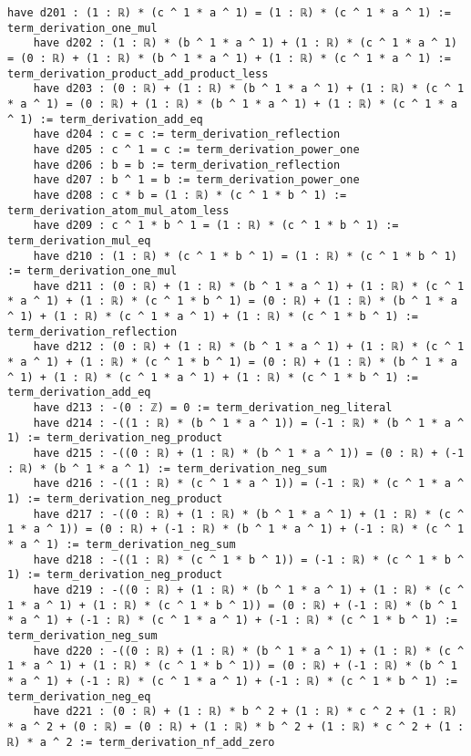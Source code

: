 \documentclass{article}
\begin{document}
\begin{tcolorbox}[colback=white!10, width=\linewidth]
\begin{lstlisting}[language=Lean4]
    have d201 : (1 : ℝ) * (c ^ 1 * a ^ 1) = (1 : ℝ) * (c ^ 1 * a ^ 1) := term_derivation_one_mul
    have d202 : (1 : ℝ) * (b ^ 1 * a ^ 1) + (1 : ℝ) * (c ^ 1 * a ^ 1) = (0 : ℝ) + (1 : ℝ) * (b ^ 1 * a ^ 1) + (1 : ℝ) * (c ^ 1 * a ^ 1) := term_derivation_product_add_product_less
    have d203 : (0 : ℝ) + (1 : ℝ) * (b ^ 1 * a ^ 1) + (1 : ℝ) * (c ^ 1 * a ^ 1) = (0 : ℝ) + (1 : ℝ) * (b ^ 1 * a ^ 1) + (1 : ℝ) * (c ^ 1 * a ^ 1) := term_derivation_add_eq
    have d204 : c = c := term_derivation_reflection
    have d205 : c ^ 1 = c := term_derivation_power_one
    have d206 : b = b := term_derivation_reflection
    have d207 : b ^ 1 = b := term_derivation_power_one
    have d208 : c * b = (1 : ℝ) * (c ^ 1 * b ^ 1) := term_derivation_atom_mul_atom_less
    have d209 : c ^ 1 * b ^ 1 = (1 : ℝ) * (c ^ 1 * b ^ 1) := term_derivation_mul_eq
    have d210 : (1 : ℝ) * (c ^ 1 * b ^ 1) = (1 : ℝ) * (c ^ 1 * b ^ 1) := term_derivation_one_mul
    have d211 : (0 : ℝ) + (1 : ℝ) * (b ^ 1 * a ^ 1) + (1 : ℝ) * (c ^ 1 * a ^ 1) + (1 : ℝ) * (c ^ 1 * b ^ 1) = (0 : ℝ) + (1 : ℝ) * (b ^ 1 * a ^ 1) + (1 : ℝ) * (c ^ 1 * a ^ 1) + (1 : ℝ) * (c ^ 1 * b ^ 1) := term_derivation_reflection
    have d212 : (0 : ℝ) + (1 : ℝ) * (b ^ 1 * a ^ 1) + (1 : ℝ) * (c ^ 1 * a ^ 1) + (1 : ℝ) * (c ^ 1 * b ^ 1) = (0 : ℝ) + (1 : ℝ) * (b ^ 1 * a ^ 1) + (1 : ℝ) * (c ^ 1 * a ^ 1) + (1 : ℝ) * (c ^ 1 * b ^ 1) := term_derivation_add_eq
    have d213 : -(0 : ℤ) = 0 := term_derivation_neg_literal
    have d214 : -((1 : ℝ) * (b ^ 1 * a ^ 1)) = (-1 : ℝ) * (b ^ 1 * a ^ 1) := term_derivation_neg_product
    have d215 : -((0 : ℝ) + (1 : ℝ) * (b ^ 1 * a ^ 1)) = (0 : ℝ) + (-1 : ℝ) * (b ^ 1 * a ^ 1) := term_derivation_neg_sum
    have d216 : -((1 : ℝ) * (c ^ 1 * a ^ 1)) = (-1 : ℝ) * (c ^ 1 * a ^ 1) := term_derivation_neg_product
    have d217 : -((0 : ℝ) + (1 : ℝ) * (b ^ 1 * a ^ 1) + (1 : ℝ) * (c ^ 1 * a ^ 1)) = (0 : ℝ) + (-1 : ℝ) * (b ^ 1 * a ^ 1) + (-1 : ℝ) * (c ^ 1 * a ^ 1) := term_derivation_neg_sum
    have d218 : -((1 : ℝ) * (c ^ 1 * b ^ 1)) = (-1 : ℝ) * (c ^ 1 * b ^ 1) := term_derivation_neg_product
    have d219 : -((0 : ℝ) + (1 : ℝ) * (b ^ 1 * a ^ 1) + (1 : ℝ) * (c ^ 1 * a ^ 1) + (1 : ℝ) * (c ^ 1 * b ^ 1)) = (0 : ℝ) + (-1 : ℝ) * (b ^ 1 * a ^ 1) + (-1 : ℝ) * (c ^ 1 * a ^ 1) + (-1 : ℝ) * (c ^ 1 * b ^ 1) := term_derivation_neg_sum
    have d220 : -((0 : ℝ) + (1 : ℝ) * (b ^ 1 * a ^ 1) + (1 : ℝ) * (c ^ 1 * a ^ 1) + (1 : ℝ) * (c ^ 1 * b ^ 1)) = (0 : ℝ) + (-1 : ℝ) * (b ^ 1 * a ^ 1) + (-1 : ℝ) * (c ^ 1 * a ^ 1) + (-1 : ℝ) * (c ^ 1 * b ^ 1) := term_derivation_neg_eq
    have d221 : (0 : ℝ) + (1 : ℝ) * b ^ 2 + (1 : ℝ) * c ^ 2 + (1 : ℝ) * a ^ 2 + (0 : ℝ) = (0 : ℝ) + (1 : ℝ) * b ^ 2 + (1 : ℝ) * c ^ 2 + (1 : ℝ) * a ^ 2 := term_derivation_nf_add_zero

\end{lstlisting}
\end{tcolorbox}
\end{document}
